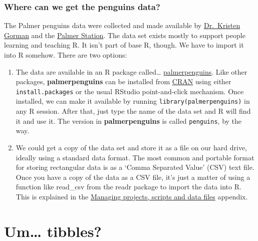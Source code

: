 \documentclass[
]{book}
\newenvironment{greybox}{
  \definecolor{shadecolor}{rgb}{0.95,0.95,0.95}  %
  \color{black}
  \begin{shaded}}
 {\end{shaded}}
\newenvironment{infobox}[1]
  {
  \begin{itemize}
  \renewcommand{\labelitemi}{
    \raisebox{-.7\height}[0pt][0pt]{
      {\setkeys{Gin}{width=3em,keepaspectratio}
        \texttt{[image: images/\#1]}}
    }
  }
  \setlength{\fboxsep}{1em}
  \begin{greybox}
  \item
  }
  {
  \end{greybox}
  \end{itemize}
  }
\begin{document}
\begin{infobox}{information}

\hypertarget{where-can-we-get-the-penguins-data}{%
\subsubsection*{Where can we get the penguins data?}\label{where-can-we-get-the-penguins-data}}

The Palmer penguins data were collected and made available by \href{https://www.uaf.edu/cfos/people/faculty/detail/kristen-gorman.php}{Dr.~Kristen Gorman} and the \href{https://pal.lternet.edu/}{Palmer Station}. The data set exists mostly to support people learning and teaching R. It isn't part of base R, though. We have to import it into R somehow. There are two options:

\begin{enumerate}
\def\labelenumi{\arabic{enumi}.}
\item
  The data are available in an R package called\ldots{} \href{https://allisonhorst.github.io/palmerpenguins/index.html}{palmerpenguins}. Like other packages, \textbf{palmerpenguins} can be installed from \href{https://cran.r-project.org/web/packages/palmerpenguins/index.html}{CRAN} using either \texttt{install.packages} or the usual RStudio point-and-click mechanism. Once installed, we can make it available by running \texttt{library(palmerpenguins)} in any R session. After that, just type the name of the data set and R will find it and use it. The version in \textbf{palmerpenguins} is called \texttt{penguins}, by the way.
\item
  We could get a copy of the data set and store it as a file on our hard drive, ideally using a standard data format. The most common and portable format for storing rectangular data is as a `Comma Separated Value' (CSV) text file. Once you have a copy of the data as a CSV file, it's just a matter of using a function like read\_csv from the readr package to import the data into R. This is explained in the \protect\hyperlink{project-scripts-data}{Managing projects, scripts and data files} appendix.
\end{enumerate}

\end{infobox}

\hypertarget{um-tibbles}{%
\section{Um\ldots{} tibbles?}\label{um-tibbles}}
\end{document}
